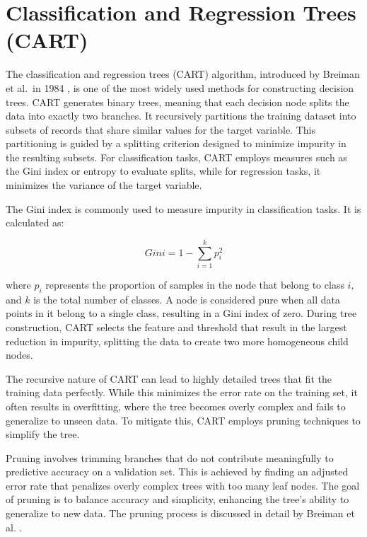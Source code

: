 \documentclass[
  11pt,
]{book}
\theoremstyle{definition}
\theoremstyle{definition}
\theoremstyle{definition}
\theoremstyle{definition}
\theoremstyle{remark}
\begin{document}
\section{Classification and Regression Trees (CART)}\label{classification-and-regression-trees-cart}

The classification and regression trees (CART) algorithm, introduced by Breiman et al.~in 1984 \citep{breiman1984classification}, is one of the most widely used methods for constructing decision trees. CART generates binary trees, meaning that each decision node splits the data into exactly two branches. It recursively partitions the training dataset into subsets of records that share similar values for the target variable. This partitioning is guided by a splitting criterion designed to minimize impurity in the resulting subsets. For classification tasks, CART employs measures such as the Gini index or entropy to evaluate splits, while for regression tasks, it minimizes the variance of the target variable.

The Gini index is commonly used to measure impurity in classification tasks. It is calculated as:

\[
Gini = 1 - \sum_{i=1}^k p_i^2
\]

where \(p_i\) represents the proportion of samples in the node that belong to class \(i\), and \(k\) is the total number of classes. A node is considered pure when all data points in it belong to a single class, resulting in a Gini index of zero. During tree construction, CART selects the feature and threshold that result in the largest reduction in impurity, splitting the data to create two more homogeneous child nodes.

The recursive nature of CART can lead to highly detailed trees that fit the training data perfectly. While this minimizes the error rate on the training set, it often results in overfitting, where the tree becomes overly complex and fails to generalize to unseen data. To mitigate this, CART employs pruning techniques to simplify the tree.

Pruning involves trimming branches that do not contribute meaningfully to predictive accuracy on a validation set. This is achieved by finding an adjusted error rate that penalizes overly complex trees with too many leaf nodes. The goal of pruning is to balance accuracy and simplicity, enhancing the tree's ability to generalize to new data. The pruning process is discussed in detail by Breiman et al. \citep{breiman1984classification}.
\end{document}

